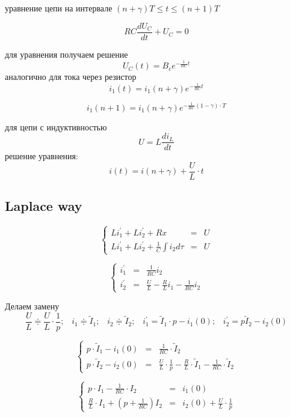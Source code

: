 \documentclass[a4paper,12pt]{article}
\begin{document}
уравнение цепи на интервале $(n+\gamma)T \le t \le (n+1)T$

$$
RC \frac{d U_C}{dt} + U_C = 0
$$


 для уравнения получаем решение
$$
U_C(t) = B_c e^{-\frac{1}{RC}t}
$$
аналогично для тока через резистор
$$
i_1(t) = i_1(n+\gamma) e^{-\frac{1}{RC}t}
$$

$$
i_1(n+1) = i_1(n+\gamma) e^{-\frac{1}{RC}(1-\gamma)\cdot T}
$$

для цепи с индуктивностью 
$$
U = L\frac{d i_L}{dt} 
$$
решение уравнения:
$$
i(t) = i(n+\gamma) + \frac{U}{L}\cdot t
$$


\subsection{Laplace way}

$$
\left\{
\begin{array}{lcl}
	Li_1^\prime + L i_2^\prime + Rx &=& U\\[1.5mm]
	Li_1^\prime + L i_2^\prime + \frac{1}{C}\int i_2 d\tau &=& U
\end{array}
\right.
$$

$$
\left\{
\begin{array}{lcl}
	i_1^\prime &=& \frac{1}{RC} i_2\\[1.5mm]
	i_2^\prime &=& \frac{U}{L} - \frac{R}{L} i_1 - \frac{1}{RC} i_2
\end{array}
\right.
$$

Делаем замену
$$
\frac{U}{L} \doteqdot \frac{U}{L} \cdot \frac{1}{p};\; \; \; i_1 \doteqdot \tilde{I}_1 ;\; \; \; i_2 \doteqdot \tilde{I}_2; \; \; \;
i_1^\prime = \tilde{I}_1\cdot p - i_1(0); \; \; \;  i_2^\prime = p \tilde{I}_2 - i_2(0)
$$

$$
\left\{
	\begin{array}{lcl}
		p\cdot \tilde{I}_1 - i_1(0) &=& \frac{1}{RC} \cdot \tilde{I}_2\\[1.5mm]
		p\cdot \tilde{I}_2 - i_2(0) &=& \frac{U}{L}\cdot \frac{1}{p} - \frac{R}{L}\cdot \tilde{I}_1 -  \frac{1}{RC} \cdot \tilde{I}_2
	\end{array}
\right.
$$

$$
\left\{
\begin{array}{lcl}
	p\cdot I_1 - \frac{1}{RC}\cdot I_2& =& i_1(0)\\[1.5mm]
	\frac{R}{L}\cdot I_1 + \left( p + \frac{1}{RC}\right) I_2 &=& i_2(0) + \frac{U}{L}\cdot \frac{1}{p}
\end{array}
\right.
$$
\end{document}
